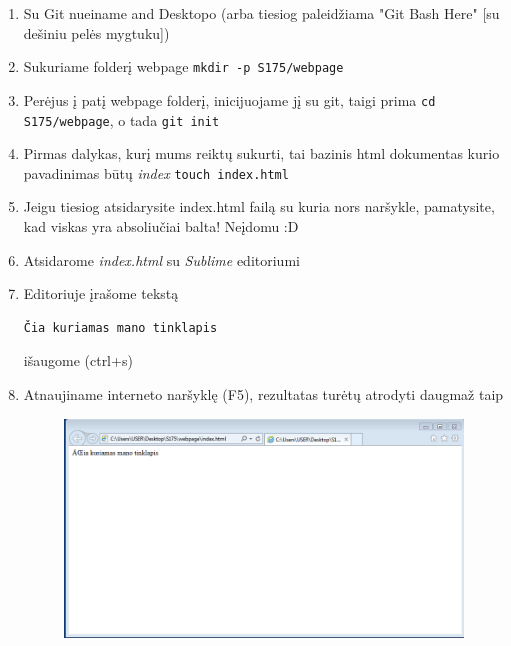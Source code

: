 \documentclass[12pt,a4paper]{article}
\begin{document}
\begin{enumerate}
\item Su Git nueiname and Desktopo (arba tiesiog paleidžiama "Git Bash Here" [su dešiniu pelės mygtuku])
\item Sukuriame folderį webpage \colorbox{listinggray}{\lstinline|mkdir -p S175/webpage|}
\item Perėjus į patį webpage folderį, inicijuojame jį su git, taigi prima \colorbox{listinggray}{\lstinline|cd S175/webpage|}, o tada \colorbox{listinggray}{\lstinline|git init|}
\item Pirmas dalykas, kurį mums reiktų sukurti, tai bazinis html dokumentas kurio pavadinimas būtų \textit{index} \colorbox{listinggray}{\lstinline|touch index.html|}
\item Jeigu tiesiog atsidarysite index.html failą su kuria nors naršykle, pamatysite, kad viskas yra absoliučiai balta! Neįdomu :D
\item Atsidarome \textit{index.html} su \textit{Sublime} editoriumi
\item Editoriuje įrašome tekstą
\begin{lstlisting}
Čia kuriamas mano tinklapis
\end{lstlisting}
išaugome (ctrl+s)
\item Atnaujiname interneto naršyklę (F5), rezultatas turėtų atrodyti daugmaž taip

\begin{figure}[ht]
\center
\includegraphics[scale=0.3]{webpage_1.png}
\end{figure}


\end{enumerate}
\end{document}
